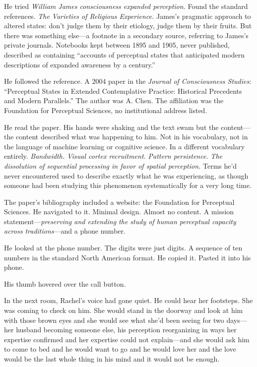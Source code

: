 He tried \textit{William James consciousness expanded perception.} Found the standard references. \textit{The Varieties of Religious Experience.} James's pragmatic approach to altered states: don't judge them by their etiology, judge them by their fruits. But there was something else---a footnote in a secondary source, referring to James's private journals. Notebooks kept between 1895 and 1905, never published, described as containing ``accounts of perceptual states that anticipated modern descriptions of expanded awareness by a century.''

He followed the reference. A 2004 paper in the \textit{Journal of Consciousness Studies}: ``Perceptual States in Extended Contemplative Practice: Historical Precedents and Modern Parallels.'' The author was A. Chen. The affiliation was the Foundation for Perceptual Sciences, no institutional address listed.

He read the paper. His hands were shaking and the text swam but the content---the content described what was happening to him. Not in his vocabulary, not in the language of machine learning or cognitive science. In a different vocabulary entirely. \textit{Bandwidth.} \textit{Visual cortex recruitment.} \textit{Pattern persistence.} \textit{The dissolution of sequential processing in favor of spatial perception.} Terms he'd never encountered used to describe exactly what he was experiencing, as though someone had been studying this phenomenon systematically for a very long time.

The paper's bibliography included a website: the Foundation for Perceptual Sciences. He navigated to it. Minimal design. Almost no content. A mission statement---\textit{preserving and extending the study of human perceptual capacity across traditions}---and a phone number.

He looked at the phone number. The digits were just digits. A sequence of ten numbers in the standard North American format. He copied it. Pasted it into his phone.

His thumb hovered over the call button.

In the next room, Rachel's voice had gone quiet. He could hear her footsteps. She was coming to check on him. She would stand in the doorway and look at him with those brown eyes and she would see what she'd been seeing for two days---her husband becoming someone else, his perception reorganizing in ways her expertise confirmed and her expertise could not explain---and she would ask him to come to bed and he would want to go and he would love her and the love would be the last whole thing in his mind and it would not be enough.

